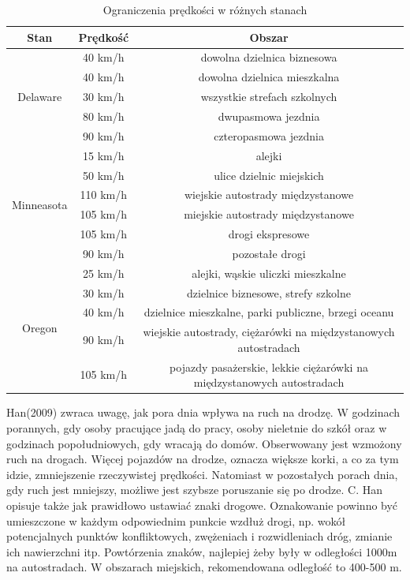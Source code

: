 \begin{table}[ht]
\centering
\caption{Ograniczenia prędkości w różnych stanach}
\label{ograniczeniaStany}
\begin{tabular}{|c|c|c|}
\hline
\textbf{Stan}                    & \textbf{Prędkość} & \textbf{Obszar} \\ \hline
\multirow{5}{*}{Delaware}   & 40 km/h & dowolna dzielnica biznesowa \\ \cline{2-3}
& 40 km/h & dowolna dzielnica mieszkalna \\ \cline{2-3}
& 30 km/h & wszystkie strefach szkolnych \\ \cline{2-3}
& 80 km/h & dwupasmowa jezdnia \\ \cline{2-3}
& 90 km/h & czteropasmowa jezdnia \\ \hline

\multirow{6}{*}{Minneasota}   & 15 km/h & alejki \\ \cline{2-3}
& 50 km/h & ulice dzielnic miejskich \\ \cline{2-3}
& 110 km/h & wiejskie autostrady międzystanowe \\ \cline{2-3}
& 105 km/h & miejskie autostrady międzystanowe \\ \cline{2-3}
& 105 km/h & drogi ekspresowe \\ \cline{2-3}
& 90 km/h & pozostałe drogi \\ \hline

\multirow{5}{*}{Oregon}   & 25 km/h & alejki, wąskie uliczki mieszkalne  \\ \cline{2-3}
& 30 km/h & dzielnice biznesowe, strefy szkolne \\ \cline{2-3}
& 40 km/h & dzielnice mieszkalne, parki publiczne, brzegi oceanu \\ \cline{2-3}
& 90 km/h & wiejskie autostrady, ciężarówki na międzystanowych autostradach \\ \cline{2-3}
& 105 km/h & pojazdy pasażerskie, lekkie ciężarówki na międzystanowych autostradach\\ \hline
\end{tabular}
\end{table} 


Han(2009) zwraca uwagę, jak pora dnia wpływa na ruch na drodzę. W godzinach porannych, gdy osoby pracujące jadą do pracy, osoby nieletnie do szkół oraz w godzinach popołudniowych, gdy wracają do domów. Obserwowany jest wzmożony ruch na drogach. Więcej pojazdów na drodze, oznacza większe korki, a co za tym idzie, zmniejszenie rzeczywistej prędkości. Natomiast w pozostałych porach dnia, gdy ruch jest mniejszy, możliwe jest szybsze poruszanie się po drodze. C. Han opisuje także jak prawidłowo ustawiać znaki drogowe. Oznakowanie powinno być umieszczone w każdym odpowiednim punkcie wzdłuż drogi, np. wokół potencjalnych punktów konfliktowych, zwężeniach i rozwidleniach dróg, zmianie ich nawierzchni itp. Powtórzenia znaków, najlepiej żeby były w odległości 1000m na autostradach. W obszarach miejskich, rekomendowana odległość to 400-500 m.

